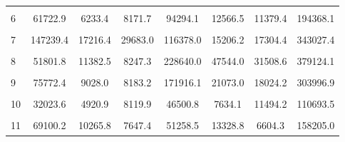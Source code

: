 {\begin{tabular}{l*{7}{c}}
                    &                     &                     &                     &                     &                     &                     &                     \\
[1em]
6                   &     61722.9         &      6233.4         &      8171.7         &     94294.1         &     12566.5         &     11379.4         &    194368.1         \\
                    &                     &                     &                     &                     &                     &                     &                     \\
[1em]
7                   &    147239.4         &     17216.4         &     29683.0         &    116378.0         &     15206.2         &     17304.4         &    343027.4         \\
                    &                     &                     &                     &                     &                     &                     &                     \\
[1em]
8                   &     51801.8         &     11382.5         &      8247.3         &    228640.0         &     47544.0         &     31508.6         &    379124.1         \\
                    &                     &                     &                     &                     &                     &                     &                     \\
[1em]
9                   &     75772.4         &      9028.0         &      8183.2         &    171916.1         &     21073.0         &     18024.2         &    303996.9         \\
                    &                     &                     &                     &                     &                     &                     &                     \\
[1em]
10                  &     32023.6         &      4920.9         &      8119.9         &     46500.8         &      7634.1         &     11494.2         &    110693.5         \\
                    &                     &                     &                     &                     &                     &                     &                     \\
[1em]
11                  &     69100.2         &     10265.8         &      7647.4         &     51258.5         &     13328.8         &      6604.3         &    158205.0         \\

\end{tabular}}
